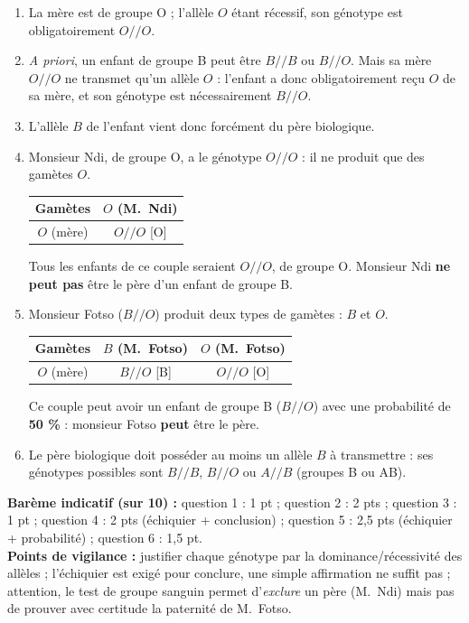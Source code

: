 \documentclass[11pt]{article}
\begin{document}
\begin{corrige}
\begin{enumerate}
\item La mère est de groupe O ; l'allèle $O$ étant récessif, son génotype est obligatoirement $O//O$.
\item \emph{A priori}, un enfant de groupe B peut être $B//B$ ou $B//O$. Mais sa mère $O//O$ ne transmet qu'un allèle $O$ : l'enfant a donc obligatoirement reçu $O$ de sa mère, et son génotype est nécessairement $B//O$.
\item L'allèle $B$ de l'enfant vient donc forcément du père biologique.
\item Monsieur Ndi, de groupe O, a le génotype $O//O$ : il ne produit que des gamètes $O$.
\begin{center}
\begin{tabular}{|c|c|}
\hline
\rowcolor{popblueL} \textbf{Gamètes} & $O$ (M.~Ndi) \\
\hline
$O$ (mère) & $O//O$ [O] \\
\hline
\end{tabular}
\end{center}
Tous les enfants de ce couple seraient $O//O$, de groupe O. Monsieur Ndi \textbf{ne peut pas} être le père d'un enfant de groupe B.
\item Monsieur Fotso ($B//O$) produit deux types de gamètes : $B$ et $O$.
\begin{center}
\begin{tabular}{|c|c|c|}
\hline
\rowcolor{popblueL} \textbf{Gamètes} & $B$ (M.~Fotso) & $O$ (M.~Fotso) \\
\hline
$O$ (mère) & $B//O$ [B] & $O//O$ [O] \\
\hline
\end{tabular}
\end{center}
Ce couple peut avoir un enfant de groupe B ($B//O$) avec une probabilité de \textbf{50 \%} : monsieur Fotso \textbf{peut} être le père.
\item Le père biologique doit posséder au moins un allèle $B$ à transmettre : ses génotypes possibles sont $B//B$, $B//O$ ou $A//B$ (groupes B ou AB).
\end{enumerate}
\textbf{Barème indicatif (sur 10) :} question 1 : 1 pt ; question 2 : 2 pts ; question 3 : 1 pt ; question 4 : 2 pts (échiquier + conclusion) ; question 5 : 2,5 pts (échiquier + probabilité) ; question 6 : 1,5 pt.\\
\textbf{Points de vigilance :} justifier chaque génotype par la dominance/récessivité des allèles ; l'échiquier est exigé pour conclure, une simple affirmation ne suffit pas ; attention, le test de groupe sanguin permet d'\emph{exclure} un père (M.~Ndi) mais pas de prouver avec certitude la paternité de M.~Fotso.
\end{corrige}
\end{document}
